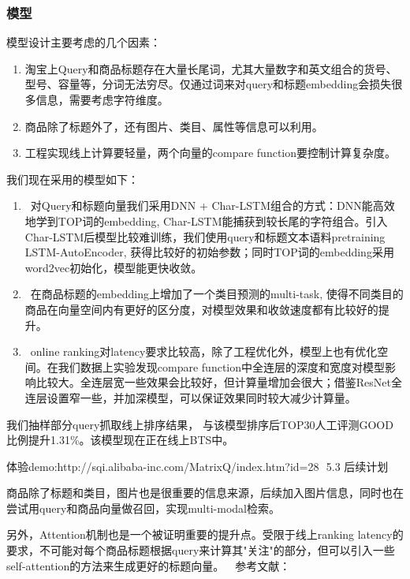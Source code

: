 \subsubsection{模型}
模型设计主要考虑的几个因素：
\begin{enumerate}
\item 淘宝上Query和商品标题存在大量长尾词，尤其大量数字和英文组合的货号、型号、容量等，分词无法穷尽。仅通过词来对query和标题embedding会损失很多信息，需要考虑字符维度。
\item 商品除了标题外了，还有图片、类目、属性等信息可以利用。
\item 工程实现线上计算要轻量，两个向量的compare function要控制计算复杂度。
\end{enumerate}
我们现在采用的模型如下：   
\begin{enumerate}
\item 对Query和标题向量我们采用DNN + Char-LSTM组合的方式：DNN能高效地学到TOP词的embedding, Char-LSTM能捕获到较长尾的字符组合。引入Char-LSTM后模型比较难训练，我们使用query和标题文本语料pretraining LSTM-AutoEncoder, 获得比较好的初始参数；同时TOP词的embedding采用word2vec初始化，模型能更快收敛。
\item 在商品标题的embedding上增加了一个类目预测的multi-task, 使得不同类目的商品在向量空间内有更好的区分度，对模型效果和收敛速度都有比较好的提升。
\item online ranking对latency要求比较高，除了工程优化外，模型上也有优化空间。在我们数据上实验发现compare function中全连层的深度和宽度对模型影响比较大。全连层宽一些效果会比较好，但计算量增加会很大；借鉴ResNet全连层设置窄一些，并加深模型，可以保证效果同时较大减少计算量。
\end{enumerate}
我们抽样部分query抓取线上排序结果， 与该模型排序后TOP30人工评测GOOD比例提升1.31\%。该模型现在正在线上BTS中。           
\par 体验demo:http://sqi.alibaba-inc.com/MatrixQ/index.htm?id=28  5.3 后续计划
\par 商品除了标题和类目，图片也是很重要的信息来源，后续加入图片信息，同时也在尝试用query和商品向量做召回，实现multi-modal检索。
\par 另外，Attention机制也是一个被证明重要的提升点。受限于线上ranking latency的要求，不可能对每个商品标题根据query来计算其"关注"的部分，但可以引入一些self-attention的方法来生成更好的标题向量。   参考文献：
